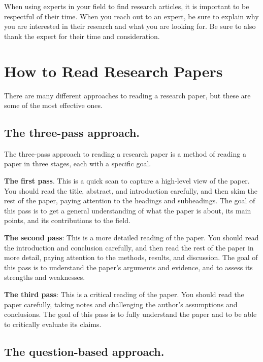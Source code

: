 \documentclass[
]{book}
\begin{document}
When using experts in your field to find research articles, it is important to be respectful of their time. When you reach out to an expert, be sure to explain why you are interested in their research and what you are looking for. Be sure to also thank the expert for their time and consideration.

\section{How to Read Research Papers}\label{read}

There are many different approaches to reading a research paper, but these are some of the most effective ones.

\subsection*{The three-pass approach.}\label{the-three-pass-approach.}

The three-pass approach to reading a research paper is a method of reading a paper in three stages, each with a specific goal.

\textbf{The first pass}. This is a quick scan to capture a high-level view of the paper. You should read the title, abstract, and introduction carefully, and then skim the rest of the paper, paying attention to the headings and subheadings. The goal of this pass is to get a general understanding of what the paper is about, its main points, and its contributions to the field.

\textbf{The second pass}: This is a more detailed reading of the paper. You should read the introduction and conclusion carefully, and then read the rest of the paper in more detail, paying attention to the methods, results, and discussion. The goal of this pass is to understand the paper's arguments and evidence, and to assess its strengths and weaknesses.

\textbf{The third pass}: This is a critical reading of the paper. You should read the paper carefully, taking notes and challenging the author's assumptions and conclusions. The goal of this pass is to fully understand the paper and to be able to critically evaluate its claims.

\subsection*{The question-based approach.}\label{the-question-based-approach.}
\end{document}
